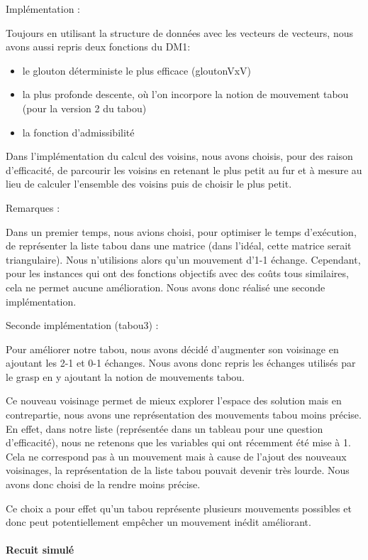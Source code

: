 Implémentation :

Toujours en utilisant la structure de données avec les vecteurs de vecteurs, nous avons aussi repris deux fonctions du DM1:
\begin{itemize}
    \item le glouton déterministe le plus efficace (gloutonVxV)
    \item la plus profonde descente, où l'on incorpore la notion de mouvement tabou (pour la version 2 du tabou)
    \item la fonction d'admissibilité
\end{itemize}

Dans l'implémentation du calcul des voisins, nous avons choisis, pour des raison d'efficacité, de parcourir les voisins en retenant le plus petit au fur et à mesure au lieu de calculer l'ensemble des voisins puis de choisir le plus petit.


Remarques :

Dans un premier temps, nous avions choisi, pour optimiser le temps d'exécution, de représenter la liste tabou dans une matrice (dans l'idéal, cette matrice serait triangulaire). Nous n'utilisions alors qu'un mouvement d'1-1 échange. Cependant, pour les instances qui ont des fonctions objectifs avec des coûts tous similaires, cela ne permet aucune amélioration. Nous avons donc réalisé une seconde implémentation.

Seconde implémentation (tabou3) :

Pour améliorer notre tabou, nous avons décidé d'augmenter son voisinage en ajoutant les 2-1 et 0-1 échanges. Nous avons donc repris les échanges utilisés par le grasp en y ajoutant la notion de mouvements tabou.

Ce nouveau voisinage permet de mieux explorer l'espace des solution mais en contrepartie, nous avons une représentation des mouvements tabou moins précise. En effet, dans notre liste (représentée dans un tableau pour une question d'efficacité), nous ne retenons que les variables qui ont récemment été mise à 1. Cela ne correspond pas à un mouvement mais à cause de l'ajout des nouveaux voisinages, la représentation de la liste tabou pouvait devenir très lourde. Nous avons donc choisi de la rendre moins précise.

Ce choix a pour effet qu'un tabou représente plusieurs mouvements possibles et donc peut potentiellement empêcher un mouvement inédit améliorant.


\paragraph{Recuit simulé}


